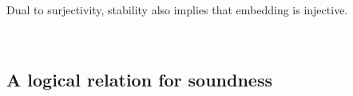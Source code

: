\documentclass[authoryear, acmsmall, screen, review, nonacm]{acmart} %
\begin{document}
Dual to surjectivity, stability also implies that embedding is injective.
 
\begin{code}%
\>[0]\AgdaSpace{}%
\AgdaSymbol{:}\AgdaSpace{}%
\AgdaSpace{}%
\AgdaSymbol{(}\AgdaSpace{}%
\AgdaSpace{}%
\AgdaSymbol{:}\AgdaSpace{}%
\AgdaSpace{}%
\AgdaSpace{}%
\AgdaSymbol{)}\AgdaSpace{}%
\AgdaSpace{}%
\AgdaSpace{}%
\AgdaSpace{}%
\AgdaSpace{}%
\AgdaSpace{}%
\AgdaSpace{}%
\AgdaSpace{}%
\AgdaSpace{}%
\AgdaSpace{}%
\<%
\\
\>[0]\AgdaSpace{}%
\AgdaSpace{}%
\AgdaSpace{}%
\AgdaSpace{}%
\AgdaSymbol{=}\AgdaSpace{}%
\AgdaSpace{}%
\AgdaSymbol{(}\AgdaSpace{}%
\AgdaSymbol{(}\AgdaSpace{}%
\AgdaSymbol{))}\AgdaSpace{}%
\AgdaSymbol{(}\AgdaSpace{}%
\AgdaSymbol{(}\AgdaSpace{}%
\AgdaSpace{}%
\AgdaSymbol{)}\AgdaSpace{}%
\AgdaSymbol{(}\AgdaSpace{}%
\AgdaSymbol{))}\<%
\end{code}

\subsection{A logical relation for soundness}
\end{document}
